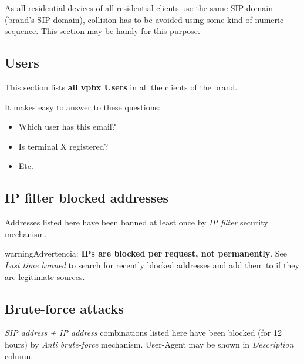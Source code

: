 \documentclass[letterpaper,10pt,spanish]{sphinxmanual}
\begin{document}
As all residential devices of all residential clients use the same SIP domain (brand's SIP domain), collision has to be
avoided using some kind of numeric sequence. This section may be handy for this purpose.


\subsection{Users}
\label{administration_portal/brand/views/users::doc}\label{administration_portal/brand/views/users:users}
This section lists \textbf{all vpbx Users} in all the clients of the brand.

It makes easy to answer to these questions:
\begin{itemize}
\item {} 
Which user has this email?

\item {} 
Is terminal X registered?

\item {} 
Etc.

\end{itemize}


\subsection{IP filter blocked addresses}
\label{administration_portal/brand/views/ipfilter_blocked_addresses:ip-filter-blocked-addresses}\label{administration_portal/brand/views/ipfilter_blocked_addresses::doc}\label{administration_portal/brand/views/ipfilter_blocked_addresses:id1}
Addresses listed here have been banned at least once by \emph{IP filter} security mechanism.

\begin{notice}{warning}{Advertencia:}
\textbf{IPs are blocked per request, not permanently}. See \emph{Last time banned} to search for recently blocked
addresses and add them to {\hyperref[security_and_maintenance/security/authorized_ip_ranges:authorized\string-ip\string-ranges]{}} if they are legitimate sources.
\end{notice}


\subsection{Brute-force attacks}
\label{administration_portal/brand/views/bruteforce_attacks::doc}\label{administration_portal/brand/views/bruteforce_attacks:brute-force-attacks}\label{administration_portal/brand/views/bruteforce_attacks:id1}
\emph{SIP address + IP address} combinations listed here have been blocked (for 12 hours) by \emph{Anti brute-force} mechanism.
User-Agent may be shown in \emph{Description} column.
\end{document}
